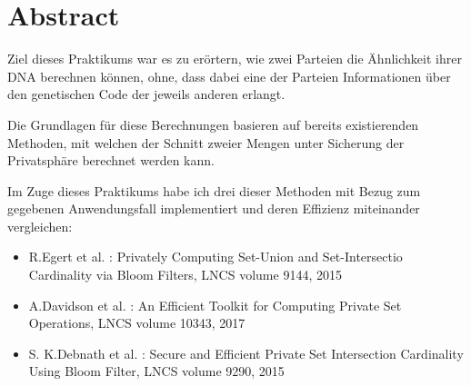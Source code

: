 \chapter*{Abstract}


Ziel dieses Praktikums war es zu erörtern, wie zwei Parteien die Ähnlichkeit ihrer DNA  berechnen können, ohne, dass dabei eine der Parteien Informationen über den genetischen Code der jeweils anderen erlangt.

Die Grundlagen für diese Berechnungen basieren auf bereits existierenden Methoden, mit welchen der Schnitt zweier Mengen unter Sicherung der Privatsphäre berechnet werden kann.

Im Zuge dieses Praktikums habe ich drei dieser Methoden mit Bezug zum gegebenen Anwendungsfall implementiert und deren Effizienz miteinander vergleichen:


\begin{itemize}
	\item R.Egert et al. : Privately Computing Set-Union and Set-Intersectio Cardinality via Bloom Filters, LNCS volume 9144, 2015
	\item A.Davidson et al. : An Efficient Toolkit for Computing Private Set Operations, LNCS volume 10343, 2017
	\item S. K.Debnath et al. : Secure and Efficient Private Set Intersection Cardinality Using Bloom Filter, LNCS volume 9290, 2015
\end{itemize}
